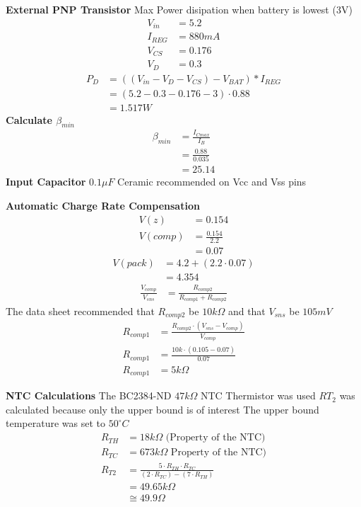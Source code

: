 \documentclass{article}
\numberwithin{figure}{section}
\numberwithin{equation}{section}
\begin{document}
{\textbf{External PNP Transistor} \newline
Max Power disipation when battery is lowest (3V)
\begin{align*}
  V_{in} &= 5.2 \\
  I_{REG} &= 880mA \\
  V_{CS} &= 0.176 \\
  V_D &= 0.3
\end{align*}
\begin{align}
  \label{eq:diodepwr}
  P_D &= \left(\left(V_{in} - V_D - V_{CS}\right) - V_{BAT}\right) * I_{REG} \\
  &= \left(5.2 - 0.3 - 0.176 - 3\right) \cdot 0.88 \\
  &= 1.517 W
\end{align}
\textbf{Calculate $\beta_{min}$}
\begin{align}
  \label{eq:betamin}
  \beta_{min} &= \frac{I_{Cmax}}{I_{B}} \\
  &= \frac{0.88}{0.035} \\
  &= 25.14
\end{align}
\textbf{Input Capacitor} \newline
$0.1\mu F$ Ceramic recommended on Vcc and Vss pins

\textbf{Automatic Charge Rate Compensation}
\begin{align}
  \label{eq:comp}
  V(z) &= 0.154 \\
  V(comp) &= \frac{0.154}{2.2} \\
  &= 0.07
\end{align}
\begin{align}
  \label{eq:comp2}
  V(pack) &= 4.2 + (2.2 \cdot 0.07)\\
  &= 4.354
\end{align}
\begin{align}
  \label{eq:comp3}
  \frac{V_{comp}}{V_{sns}} &= \frac{R_{comp2}}{R_{comp1}+R_{comp2}}
\end{align}
The data sheet recommended that $R_{comp2}$ be $10k\Omega$ and that $V_{sns}$ be $105mV$
\begin{align}
  \label{eq:rcomps}
  R_{comp1}&=\frac{R_{comp2} \cdot \left(V_{sns}-V_{comp}\right)}{V_{comp}} \\
  R_{comp1}&=\frac{10k \cdot (0.105 - 0.07)}{0.07} \\
  R_{comp1}&=5k\Omega
\end{align}

\textbf{NTC Calculations}
The BC2384-ND $47k\Omega$ NTC Thermistor was used
$RT_2$ was calculated because only the upper bound is of interest
The upper bound temperature was set to $50^{\circ}C$
\begin{align}
  \label{eq:ntc}
  R_{TH} &= 18k\Omega \mbox{ (Property of the NTC)}\\
  R_{TC} &= 673k\Omega \mbox{ Property of the NTC)}\\
  R_{T2} &= \frac{5 \cdot R_{TH} \cdot R_{TC}}{(2\cdot R_{TC})-(7\cdot R_{TH})} \\
  &= 49.65k\Omega \\
  &\cong 49.9\Omega
\end{align}


}
\end{document}
